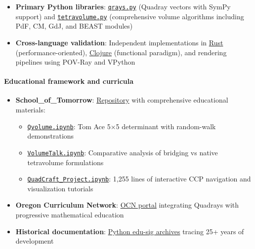 \documentclass[
  10pt,
]{article}
\providecommand{\tightlist}{%
  \setlength{\itemsep}{0pt}\setlength{\parskip}{0pt}}
\begin{document}
\begin{itemize}
\tightlist
\item
  \textbf{Primary Python libraries}:
  \href{https://github.com/4dsolutions/m4w/blob/main/qrays.py}{\texttt{qrays.py}}
  (Quadray vectors with SymPy support) and
  \href{https://github.com/4dsolutions/m4w/blob/main/tetravolume.py}{\texttt{tetravolume.py}}
  (comprehensive volume algorithms including PdF, CM, GdJ, and BEAST
  modules)
\item
  \textbf{Cross-language validation}: Independent implementations in
  \href{https://github.com/4dsolutions/rusty_rays}{Rust}
  (performance-oriented),
  \href{https://github.com/4dsolutions/synmods}{Clojure} (functional
  paradigm), and rendering pipelines using POV-Ray and VPython
\end{itemize}

\hypertarget{educational-framework-and-curricula}{%
\paragraph{Educational framework and
curricula}\label{educational-framework-and-curricula}}

\begin{itemize}
\tightlist
\item
  \textbf{School\_of\_Tomorrow}:
  \href{https://github.com/4dsolutions/School_of_Tomorrow}{Repository}
  with comprehensive educational materials:

  \begin{itemize}
  \tightlist
  \item
    \href{https://github.com/4dsolutions/School_of_Tomorrow/blob/master/Qvolume.ipynb}{\texttt{Qvolume.ipynb}}:
    Tom Ace 5×5 determinant with random-walk demonstrations
  \item
    \href{https://github.com/4dsolutions/School_of_Tomorrow/blob/master/VolumeTalk.ipynb}{\texttt{VolumeTalk.ipynb}}:
    Comparative analysis of bridging vs native tetravolume formulations
  \item
    \href{https://github.com/4dsolutions/School_of_Tomorrow/blob/master/QuadCraft_Project.ipynb}{\texttt{QuadCraft\_Project.ipynb}}:
    1,255 lines of interactive CCP navigation and visualization
    tutorials
  \end{itemize}
\item
  \textbf{Oregon Curriculum Network}:
  \href{http://www.4dsolutions.net/ocn/}{OCN portal} integrating
  Quadrays with progressive mathematical education
\item
  \textbf{Historical documentation}:
  \href{https://mail.python.org/pipermail/edu-sig/2000-May/000498.html}{Python
  edu-sig archives} tracing 25+ years of development
\end{itemize}
\end{document}
